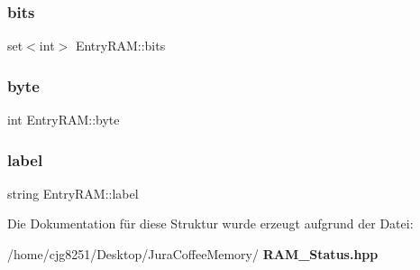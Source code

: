 \subsubsection{bits}
{\footnotesize\ttfamily set$<$int$>$ Entry\+R\+A\+M\+::bits}

\mbox{\label{struct_entry_r_a_m_a6c05b2b828a93b2f5e75ffc4c0b8d223}} 
\subsubsection{byte}
{\footnotesize\ttfamily int Entry\+R\+A\+M\+::byte}

\mbox{\label{struct_entry_r_a_m_a7e464f0594a4f376d163f6dc17a00e5b}} 
\subsubsection{label}
{\footnotesize\ttfamily string Entry\+R\+A\+M\+::label}



Die Dokumentation für diese Struktur wurde erzeugt aufgrund der Datei\+:\begin{DoxyCompactItemize}
\item 
/home/cjg8251/\+Desktop/\+Jura\+Coffee\+Memory/\textbf{ R\+A\+M\+\_\+\+Status.\+hpp}\end{DoxyCompactItemize}
